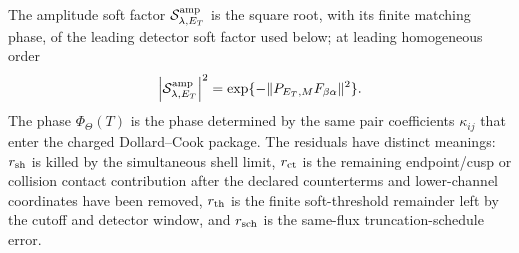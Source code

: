 \begin{controlledapproximation}
\begin{equation}
\end{equation}
The amplitude soft factor
\(\mathcal S_{\lambda,E_T}^{\rm amp}\) is the square root, with its finite
matching phase, of the leading detector soft factor used below; at leading
homogeneous order
\[
  \left|\mathcal S_{\lambda,E_T}^{\rm amp}\right|^2
  =
  \exp\{-\|P_{E_T,M}F_{\beta\alpha}\|^2\}.
\]
The phase \(\Phi_{\Theta}(T)\) is the phase determined by the same
pair coefficients \(\kappa_{ij}\) that enter the charged Dollard--Cook
package.  The residuals have distinct meanings: \(r_{\rm sh}\) is killed by
the simultaneous shell limit, \(r_{\rm ct}\) is the remaining endpoint/cusp or
collision contact contribution after the declared counterterms and
lower-channel coordinates have been removed, \(r_{\rm th}\) is the finite
soft-threshold remainder left by the cutoff and detector window, and
\(r_{\rm sch}\) is the same-flux truncation-schedule error.


\end{controlledapproximation}
